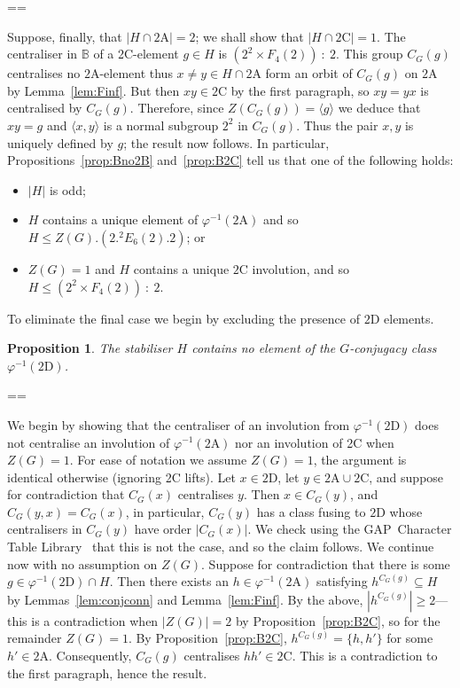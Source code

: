 \documentclass[11pt, a4paper]{amsart}
\makeatletter
\newcommand{\gap}{{\sf GAP}}
\def\cn{\mathord{{\!\:{:}\:\!}}}
\newtheorem{prop}[thm]{Proposition}
\renewcommand{\proofname}{Proof}
\renewenvironment{proof}[1][\proofname]{\par
  \pushQED{\qed}  \normalfont \partopsep=\z@skip \topsep=\z@skip
  \trivlist
  \item[\hskip\labelsep
        \scshape
    #1\@addpunct{.}]\ignorespaces
}{  \popQED\endtrivlist\@endpefalse
}
\makeatother
\begin{document}
\begin{proof}
    Suppose, finally, that $|H\cap \mathrm{2A}|=2$; we shall show that $|H\cap \mathrm{2C}|=1$. The centraliser in $\mathbb{B}$ of a 2C-element $g\in H$ is $(2^2\times F_4(2))\cn2$. This group $C_G(g)$ centralises no $\mathrm{2A}$-element thus $x\ne y\in H\cap\mathrm{2A}$ form an orbit of $C_G(g)$ on $\mathrm{2A}$ by Lemma~\ref{lem:Finf}. But then $xy\in\mathrm{2C}$ by the first paragraph, so $xy=yx$ is centralised by $C_G(g)$. Therefore, since $Z(C_G(g))=\langle g\rangle$ we deduce that $xy=g$ and $\langle x,y\rangle$ is a normal subgroup $2^2$ in $C_G(g)$. Thus the pair $x,y$ is uniquely defined by $g$; the result now follows.    
   \end{proof}
 In particular, Propositions~\ref{prop:Bno2B} and~\ref{prop:B2C} tell us that one of the following holds: \begin{itemize}
    \item $|H|$ is odd;
    \item $H$ contains a unique element of $\varphi^{-1}(\mathrm{2A})$ and so $H\leq Z(G).(2.{}^2E_6(2).2)$; or
    \item $Z(G)=1$ and $H$ contains a unique $\mathrm{2C}$ involution, and so $H\leq(2^2\times F_4(2))\cn2$.
\end{itemize}

To eliminate the final case we begin by excluding the presence of $\mathrm{2D}$ elements.

\begin{prop}\label{prop:Bno2D}
    The stabiliser $H$ contains no element of the $G$-conjugacy class $\varphi^{-1}(\mathrm{2D})$.
\end{prop}
\begin{proof}

   We begin by showing that the centraliser of an involution from $\varphi^{-1}(\mathrm{2D})$ does not centralise an involution of $\varphi^{-1}(\mathrm{2A})$ nor an involution of 2C when $Z(G)=1$. For ease of notation we assume $Z(G)=1$, the argument is identical otherwise (ignoring 2C lifts). Let $x\in\mathrm{2D}$, let $y\in\mathrm{2A}\cup\mathrm{2C}$, and suppose for contradiction that $C_G(x)$ centralises $y$. Then $x\in C_G(y)$, and $C_G(y,x)=C_G(x)$, in particular, $C_G(y)$ has a class fusing to $\mathrm{2D}$ whose centralisers in $C_G(y)$ have order $|C_G(x)|$. We check using the \gap~Character Table Library~\cite{CTblLib1.3.11} that this is not the case, and so the claim follows. 
    We continue now with no assumption on $Z(G)$. Suppose for contradiction that there is some $g\in\varphi^{-1}(\mathrm{2D})\cap H$. Then there exists an $h\in\varphi^{-1}(\mathrm{2A})$ satisfying $h^{C_G(g)}\subseteq H$ by Lemmas~\ref{lem:conjconn} and Lemma~\ref{lem:Finf}. By the above, $|h^{C_G(g)}|\geq 2$---this is a contradiction when $|Z(G)|=2$ by Proposition~\ref{prop:B2C}, so for the remainder $Z(G)=1$. By Proposition~\ref{prop:B2C}, $h^{C_G(g)}=\{h,h'\}$ for some $h'\in\mathrm{2A}$. Consequently, $C_G(g)$ centralises $hh'\in\mathrm{2C}$. This is a contradiction to the first paragraph, hence the result.
\end{proof}
\end{document}

